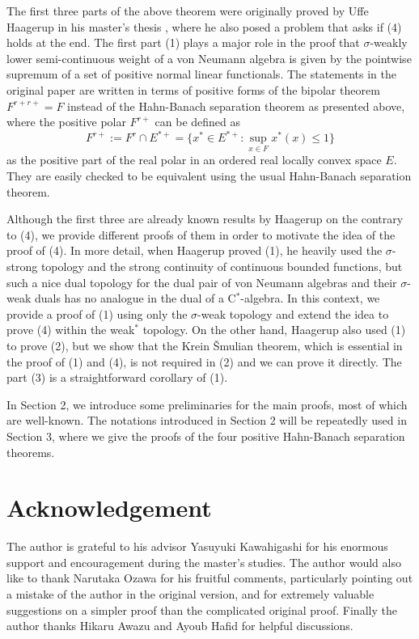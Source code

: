 \documentclass[noamsfonts,a4paper,10pt]{amsart}
\theoremstyle{plain}
\theoremstyle{definition}
\theoremstyle{remark}
\begin{document}
The first three parts of the above theorem were originally proved by Uffe Haagerup in his master's thesis \cite{MR380438}, where he also posed a problem that asks if (4) holds at the end.
The first part (1) plays a major role in the proof that $\sigma$-weakly lower semi-continuous weight of a von Neumann algebra is given by the pointwise supremum of a set of positive normal linear functionals.
The statements in the original paper are written in terms of positive forms of the bipolar theorem $F^{r+r+}=F$ instead of the Hahn-Banach separation theorem as presented above, where the positive polar $F^{r+}$ can be defined as
\[F^{r+}:=F^r\cap E^{*+}=\{x^*\in E^{*+}:\sup_{x\in F}x^*(x)\le1\}\]
as the positive part of the real polar in an ordered real locally convex space $E$.
They are easily checked to be equivalent using the usual Hahn-Banach separation theorem.

Although the first three are already known results by Haagerup on the contrary to (4), we provide different proofs of them in order to motivate the idea of the proof of (4).
In more detail, when Haagerup proved (1), he heavily used the $\sigma$-strong topology and the strong continuity of continuous bounded functions, but such a nice dual topology for the dual pair of von Neumann algebras and their $\sigma$-weak duals has no analogue in the dual of a C$^*$-algebra.
In this context, we provide a proof of (1) using only the $\sigma$-weak topology and extend the idea to prove (4) within the weak$^*$ topology.
On the other hand, Haagerup also used (1) to prove (2), but we show that the Krein \v Smulian theorem, which is essential in the proof of (1) and (4), is not required in (2) and we can prove it directly.
The part (3) is a straightforward corollary of (1).

In Section 2, we introduce some preliminaries for the main proofs, most of which are well-known.
The notations introduced in Section 2 will be repeatedly used in Section 3, where we give the proofs of the four positive Hahn-Banach separation theorems.

\section*{Acknowledgement}
The author is grateful to his advisor Yasuyuki Kawahigashi for his enormous support and encouragement during the master's studies.
The author would also like to thank Narutaka Ozawa for his fruitful comments, particularly pointing out a mistake of the author in the original version, and for extremely valuable suggestions on a simpler proof than the complicated original proof.
Finally the author thanks Hikaru Awazu and Ayoub Hafid for helpful discussions.
\end{document}
